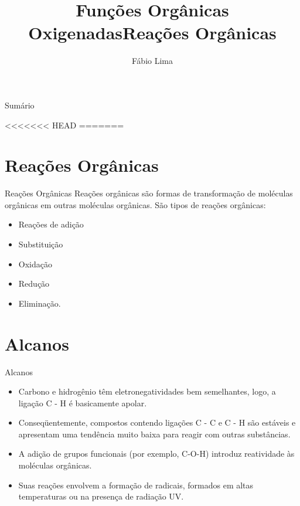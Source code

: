 \documentclass[presentation,professionalfonts,aspectratio=169]{beamer}
\date{}
\author{Fábio Lima}
\date{}
\title{Funções Orgânicas Oxigenadas}
\title{Reações Orgânicas}
\begin{document}
\maketitle
\begin{frame}{Sumário}
\tableofcontents
\end{frame}


<<<<<<< HEAD
=======
\section{Reações Orgânicas}
\label{sec:orgf15e8e9}
\begin{frame}[label={sec:org3ad96f8}]{Reações Orgânicas}
Reações orgânicas são formas de transformação de moléculas orgânicas em outras moléculas orgânicas. São tipos de reações orgânicas:
\begin{itemize}
\item Reações de adição
\item Substituição
\item Oxidação
\item Redução
\item Eliminação.
\end{itemize}
\end{frame}

\section{Alcanos}
\label{sec:orgd5a26bb}

\begin{frame}[label={sec:orgff4c293}]{Alcanos}
\begin{itemize}
\item Carbono e hidrogênio têm eletronegatividades bem semelhantes, logo, a ligação C - H é basicamente apolar.
\item Conseqüentemente, compostos contendo ligações C - C e C - H são estáveis e apresentam uma tendência muito baixa para reagir com outras substâncias.
\item A adição de grupos funcionais (por exemplo, C-O-H) introduz reatividade às moléculas orgânicas.
\item Suas reações envolvem a formação de radicais, formados em altas temperaturas ou na presença de radiação UV.
\end{itemize}
\end{frame}
\end{document}
